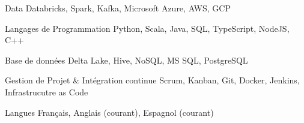 \begin{cvskills}

	\cvskill
	{Data}
	{Databricks, Spark, Kafka, Microsoft Azure, AWS, GCP}

	\cvskill
	{Langages de Programmation}
	{Python, Scala, Java, SQL, TypeScript, NodeJS, C++}
	
	\cvskill
	{Base de données}
	{Delta Lake, Hive, NoSQL, MS SQL, PostgreSQL}
	
	\cvskill
	{Gestion de Projet \& Intégration continue}
	{Scrum, Kanban, Git, Docker, Jenkins, Infrastrucutre as Code}
	
	\cvskill
	{Langues}
	{Français, Anglais (courant), Espagnol (courant)}
	
\end{cvskills}